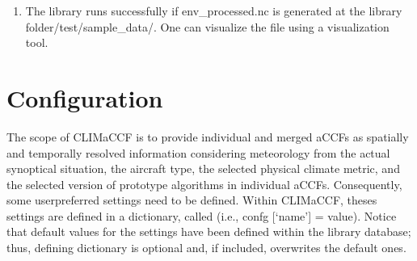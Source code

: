 \documentclass[a4paper,11pt,english]{sphinxmanual}
\begin{document}
\begin{sphinxVerbatim}[commandchars=\\\{\}]
  
\end{sphinxVerbatim}
\begin{enumerate}
%
\setcounter{enumi}{3}
\item {} 
\sphinxAtStartPar
The library runs successfully if env\_processed.nc is generated at the library folder/test/sample\_data/. One can visualize the file using a visualization tool.

\end{enumerate}


\section{Configuration}
\label{\detokenize{gStarted:configuration}}
\sphinxAtStartPar
The scope of CLIMaCCF is to provide individual and merged aCCFs as spatially and temporally resolved information considering meteorology from the actual synoptical situation, the aircraft type, the selected physical climate metric, and the selected version of prototype algorithms in individual aCCFs. Consequently, some user\sphinxhyphen{}preferred settings need to
be defined. Within CLIMaCCF, theses settings are defined in a dictionary, called  (i.e., confg {[}‘name’{]} = value). Notice that default values for the settings have been defined within the library database; thus, defining dictionary  is optional and, if included, overwrites the default ones.
\end{document}
